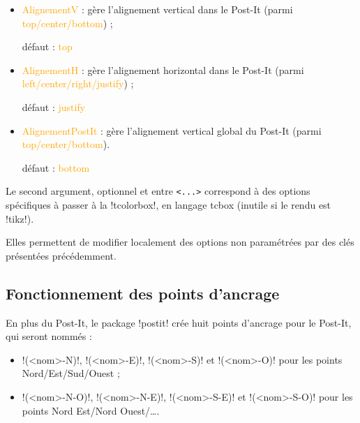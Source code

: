 \documentclass[french,a4paper,11pt]{article}
\newcommand\Cle[1]{{\small\sffamily\textlangle \textcolor{orange}{#1}\textrangle}}
\begin{document}
\begin{tipblock}
\begin{itemize}
	\hfill{}défaut : \Cle{0cm}
	\item \Cle{AlignementV} : gère l'alignement vertical dans le Post-It (parmi \Cle{top/center/bottom}) ;

	\hfill{}défaut : \Cle{top}
	\item \Cle{AlignementH} : gère l'alignement horizontal dans le Post-It (parmi \Cle{left/center/right/justify}) ;

	\hfill{}défaut : \Cle{justify}
	\item \Cle{AlignementPostIt} : gère l'alignement vertical global du Post-It (parmi \Cle{top/center/bottom}).

	\hfill{}défaut : \Cle{bottom}
\end{itemize}
\vspace*{-\baselineskip}\leavevmode
\end{tipblock}

\begin{tipblock}
Le second argument, optionnel et entre \texttt{<...>} correspond à des options spécifiques à passer à la \motcletex!tcolorbox!, en langage \textsf{tcbox} (inutile si le rendu est \motcletex!tikz!).

Elles permettent de modifier localement des options non paramétrées par des clés présentées précédemment.
\end{tipblock}

\subsection{Fonctionnement des points d'ancrage}

\begin{tipblock}
En plus du Post-It, le package \packagetex!postit! crée huit points d'ancrage pour le Post-It, qui seront nommés :

\begin{itemize}
	\item \motcletex!(<nom>-N)!, \motcletex!(<nom>-E)!, \motcletex!(<nom>-S)! et \motcletex!(<nom>-O)! pour les points Nord/Est/Sud/Ouest ;
	\item \motcletex!(<nom>-N-O)!, \motcletex!(<nom>-N-E)!, \motcletex!(<nom>-S-E)! et \motcletex!(<nom>-S-O)! pour les points Nord Est/Nord Ouest/\ldots.
\end{itemize}
\end{tipblock}

\begin{DemoCode}[]
\begin{center}
\begin{PostIt}[Inclinaison=10,Attache=Non,Rendu=tikz,RappelPostIt=MaPetiteNote1]
	\lipsum[1][1-2]
\end{PostIt}
\end{center}
\end{DemoCode}
\end{document}
